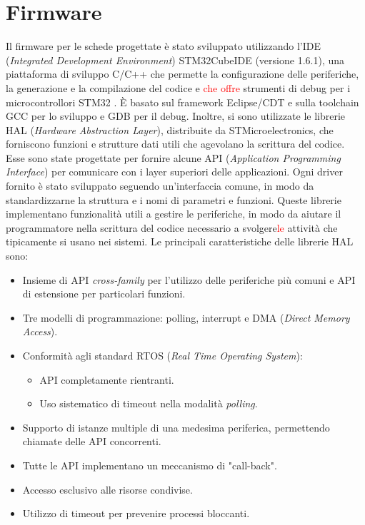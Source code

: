 \section{Firmware}\label{sec:Firmware}
Il firmware per le schede progettate è stato sviluppato utilizzando l'IDE (\textit{Integrated Development Environment}) STM32CubeIDE (versione 1.6.1), una piattaforma di sviluppo C/C++ che permette la configurazione delle periferiche, la generazione e la compilazione del codice e \textcolor{red}{che offre} strumenti di debug per i microcontrollori STM32 \cite{STMicroelectronicsSTM32CubeIDE}. \`E basato sul framework Eclipse\textregistered/CDT e sulla toolchain GCC per lo sviluppo e GDB per il debug. Inoltre, si sono utilizzate le librerie HAL (\textit{Hardware Abstraction Layer}), distribuite da STMicroelectronics, che forniscono funzioni e strutture dati utili che agevolano la scrittura del codice. Esse sono state progettate per fornire alcune API (\textit{Application Programming Interface}) per comunicare con i layer superiori delle applicazioni\cite{STMicroelectronicsHAL}. Ogni driver fornito è stato sviluppato seguendo un'interfaccia comune, in modo da standardizzarne la struttura e i nomi di parametri e funzioni. Queste librerie implementano funzionalità utili a gestire le periferiche, in modo da aiutare il programmatore nella scrittura del codice necessario a svolgere\textcolor{red}{le} attività che tipicamente si usano nei sistemi.
Le principali caratteristiche delle librerie HAL sono:
\begin{itemize}
	\item Insieme di API \textit{cross-family} per l'utilizzo delle periferiche più comuni e API di estensione per particolari funzioni.
	\item Tre modelli di programmazione: polling, interrupt e DMA (\textit{Direct Memory Access}).
	\item Conformità agli standard RTOS (\textit{Real Time Operating System}):
	\begin{itemize}
		\item API completamente rientranti.
		\item Uso sistematico di timeout nella modalità \textit{polling}.
	\end{itemize}
	\item Supporto di istanze multiple di una medesima periferica, permettendo chiamate delle API concorrenti.
	\item Tutte le API implementano un meccanismo di "call-back".
	\item Accesso esclusivo alle risorse condivise.
	\item Utilizzo di timeout per prevenire processi bloccanti.
\end{itemize}

